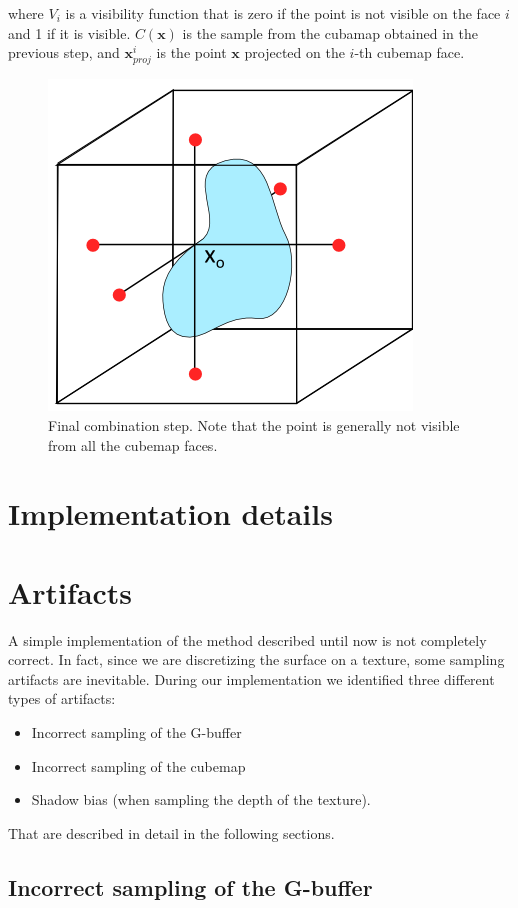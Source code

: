 where $V_{i}$ is a visibility function that is zero if the point is not visible on the face $i$ and 1 if it is visible. $C(\mathbf{x})$ is the sample from the cubamap obtained in the previous step, and $\mathbf{x}_{proj}^i$ is the point $\mathbf{x}$ projected on the $i$-th cubemap face.

\begin{figure}[!ht]
\centering
\includegraphics[width=0.5 \linewidth]{images/method/method_step3}
\caption{Final combination step. Note that the point is generally not visible from all the cubemap faces.}
\label{fig:step3}
\end{figure} 

\clearpage
\section{Implementation details}

\section{Artifacts}
A simple implementation of the method described until now is not completely correct. In fact, since we are discretizing the surface on a texture, some sampling artifacts are inevitable. During our implementation we identified three different types of artifacts:

\begin{itemize}
	\item Incorrect sampling of the G-buffer
	\item Incorrect sampling of the cubemap
	\item Shadow bias (when sampling the depth of the texture).
\end{itemize}

That are described in detail in the following sections.

\subsection{Incorrect sampling of the G-buffer}

